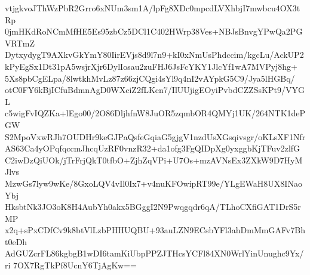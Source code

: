 vtjgkvoJThWzPbR2Grro6xNUm3sm1A/lpFg8XDc0mpcdLVXhbjI7mwbcu4OX3tRp
0jmHKdRoNCmMfHE5Es95zbCz5DCl1C402HWrp38Ves+NBJsBnvgYPwQa2PGVRTmZ
DytxydygT9AXkvGkYmY80IirEVjs8d9l7n9+kI0xNmUsPhdccim/kgcLu/AckUP2
kPyEgSx1Dt31pA5wsjrXjr6DylIosau2zuFHJ6JsFcYKY1JlcYf1wA7MVPyj8hg+
5Xs8pbCgELpa/8lwtkhMvLz87z66zjCQgi4sYl9q4nI2vAYpkG5C9/Jya5lHGBq/
otC0FY6kBjICfuBdmnAgD0WXciZ2fLKcn7/IlUUjigEOyiPvbdCZZSsKPt9/VYGL
c5wigFvIQZKa+lEgo00/2O86DljhfnW8JuOR5zqmbOR4QMYj1UK/264NTK1dePGW
S2MpoVxwRJh7OUDHr9keGJPaQsfeGqiaG5gjgV1nzdUsXGsqivsgr/oKLsXF1Nfr
AS63Ca4yOPqfqccmJhcqUzRF0vnzR32+da1ofg3FgQIDpXg0yxggbKjTFuv2zlfG
C2iwDzQiUOk/jTrFrjQkT0tfbO+ZjhZqVPi+U7Os+mzAVNsEx3ZXkW9D7HyMJlvs
MzwGs7lyw9wKe/8GxoLQV4vIl0Ix7+v4nuKFOwipRT99e/YLgEWaH8UX8INaoYbj
HksbtNk3JO3oK8H4AubYh0akx5BGggI2N9Pwqgqdr6qA/TLhoCXfiGAT1DrS5rMP
x2q+sPxCDfCv9k8btVlLzbPHHUQBU+93auLZN9ECsbYFl3ahDmMmGAFv7Bht0eDh
AdGUZcrFL86kgbgB1wDI6tamKiUbpPPZJTHcsYCFl84XN0WrlYinUnughc9Yx/ri
7OX7RgTkPf8UcnY6TjAgKw==

